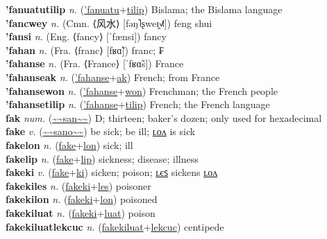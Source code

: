 \textbf{'fanuatutilip} \textit{n.} (\hyperref['fanuatu]{'fanuatu}+\hyperref[tilip]{tilip})
Bislama; the Bislama language \label{'fanuatutilip} \\
\textbf{'fancwey} \textit{n.} (Cmn. ⟨风水⟩ [fəŋ˥ʂweɪ̯˧˩˥])
feng shui \label{'fancwey} \\
\textbf{'fansi} \textit{n.} (Eng. ⟨fancy⟩ [ˈfænsi])
fancy \label{'fansi} \\
\textbf{'fahan} \textit{n.} (Fra. ⟨franc⟩ [fʁɑ̃])
franc; ₣ \label{'fahan} \\
\textbf{'fahanse} \textit{n.} (Fra. ⟨France⟩ [ˈfʁɑ̃s])
France \label{'fahanse} \\
\textbf{'fahanseak} \textit{n.} (\hyperref['fahanse]{'fahanse}+\hyperref[ak]{ak})
French; from France \label{'fahanseak} \\
\textbf{'fahansewon} \textit{n.} (\hyperref['fahanse]{'fahanse}+\hyperref[won]{won})
Frenchman; the French people \label{'fahansewon} \\
\textbf{'fahansetilip} \textit{n.} (\hyperref['fahanse]{'fahanse}+\hyperref[tilip]{tilip})
French; the French language \label{'fahansetilip} \\
\textbf{fak} \textit{num.} (\hyperref[san]{\~{}\~{}san\~{}\~{}})
D; thirteen; baker's dozen; only used for hexadecimal \label{fak} \\
\textbf{fake} \textit{v.} (\hyperref[sano]{\~{}\~{}sano\~{}\~{}})
be sick; be ill; \hyperref[fakelon]{ʟᴏᴧ} is sick \label{fake} \\
\textbf{fakelon} \textit{n.} (\hyperref[fake]{fake}+\hyperref[lon]{lon})
sick; ill \label{fakelon} \\
\textbf{fakelip} \textit{n.} (\hyperref[fake]{fake}+\hyperref[lip]{lip})
sickness; disease; illness \label{fakelip} \\
\textbf{fakeki} \textit{v.} (\hyperref[fake]{fake}+\hyperref[ki]{ki})
sicken; poison; \hyperref[fakekiles]{ʟєꜱ} sickens \hyperref[fakekilon]{ʟᴏᴧ} \label{fakeki} \\
\textbf{fakekiles} \textit{n.} (\hyperref[fakeki]{fakeki}+\hyperref[les]{les})
poisoner \label{fakekiles} \\
\textbf{fakekilon} \textit{n.} (\hyperref[fakeki]{fakeki}+\hyperref[lon]{lon})
poisoned \label{fakekilon} \\
\textbf{fakekiluat} \textit{n.} (\hyperref[fakeki]{fakeki}+\hyperref[luat]{luat})
poison \label{fakekiluat} \\
\textbf{fakekiluatlekcuc} \textit{n.} (\hyperref[fakekiluat]{fakekiluat}+\hyperref[lekcuc]{lekcuc})
centipede \label{fakekiluatlekcuc} \\

